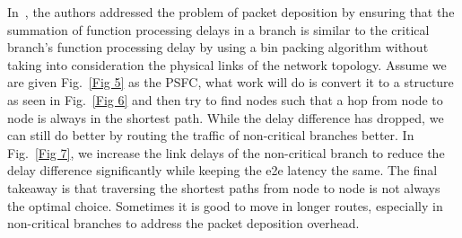 \documentclass[journal]{IEEEtran}
\begin{document}
In~\cite{appm}, the authors addressed the problem of packet deposition by ensuring that the summation of function processing delays in a branch is similar to the critical branch’s function processing delay by using a bin packing algorithm without taking into consideration the physical links of the network topology. Assume we are given Fig.~\ref{Fig 5} as the PSFC, what \cite{appm} work will do is convert it to a structure as seen in Fig.~\ref{Fig 6} and then try to find nodes such that a hop from node to node is always in the shortest path. While the delay difference has dropped, we can still do better by routing the traffic of non-critical branches better. In Fig.~\ref{Fig 7}, we increase the link delays of the non-critical branch to reduce the delay difference significantly while keeping the e2e latency the same. The final takeaway is that traversing the shortest paths from node to node is not always the optimal choice. Sometimes it is good to move in longer routes, especially in non-critical branches to address the packet deposition overhead.

\end{document}
